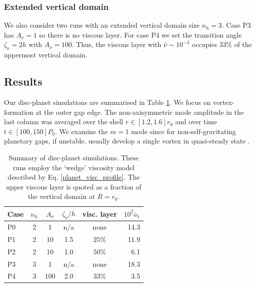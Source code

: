 \subsubsection{Extended vertical domain}
We also consider two runs with an extended vertical domain size
$n_h=3$. Case P3 has $A_\nu=1$ so there is no viscous layer. For case
P4 we set the transition angle $\zeta_\nu=2h$ with $A_\nu=100$. 
Thus, the viscous layer with $\hat{\nu}\sim10^{-4}$ occupies $33\%$ of
the uppermost vertical domain.    




\subsection{Results}
Our disc-planet simulations are summarised in Table \ref{planet_sims}.
We focus on vortex-formation at the outer gap edge. 
The non-axisymmetric mode amplitude in the last column was 
averaged over the shell $r\in[1.2,1.6]r_0$ and over time 
$t\in[100,150]P_0$. We examine the $m=1$ mode since 
for non-self-gravitating planetary gaps, if unstable, usually develop
a single vortex in quasi-steady state \citep{valborro07,lin10}.   


\begin{table}
  \centering
  \caption{Summary of disc-planet simulations. These runs employ the
    `wedge' viscosity model described by
    Eq. \ref{planet_visc_profile}. The upper viscous layer is
    quoted as a fraction of the vertical domain at 
    $R=r_0$. \label{planet_sims}}  
    \begin{tabular}{lccccr}
      \hline\hline
      Case & $n_h$ & $A_\nu$ &$\zeta_\nu/h$ & visc. layer& $10^2\overline{a}_1$ \\ 
      \hline
      P0 &  2     &    1    &    n/a      & none     &   14.3    \\%
      P1 &  2     &    10   &    1.5      & $25\%$  &    11.9     \\ 
      P2 &  2     &    10   &    1.0      & $50\%$  &    6.1      \\
      P3 &  3     &    1    &     n/a      & none  &     18.3   \\
      P4 &  3     &    100   &    2.0      & $33\%$ &     3.5    \\
      \hline
  \end{tabular}
\end{table}

